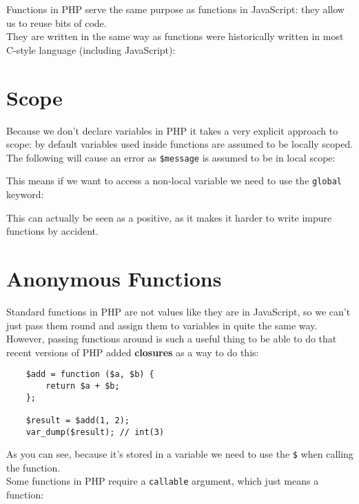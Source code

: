 Functions in PHP serve the same purpose as functions in JavaScript: they allow us to reuse bits of code.
\\

They are written in the same way as functions were historically written in most C-style language (including JavaScript):



\section{Scope}

Because we don't declare variables in PHP it takes a very explicit approach to scope: by default variables used inside functions are assumed to be locally scoped.
\\

The following will cause an error as \texttt{\$message} is assumed to be in local scope:


This means if we want to access a non-local variable we need to use the \texttt{global} keyword:


This can actually be seen as a positive, as it makes it harder to write impure functions by accident.


\section{Anonymous Functions}

Standard functions in PHP are not values like they are in JavaScript, so we can't just pass them round and assign them to variables in quite the same way. However, passing functions around is such a useful thing to be able to do that recent versions of PHP added \textbf{closures} as a way to do this:

\begin{verbatim}
    $add = function ($a, $b) {
        return $a + $b;
    };

    $result = $add(1, 2);
    var_dump($result); // int(3)
\end{verbatim}

As you can see, because it's stored in a variable we need to use the \texttt{\$} when calling the function.
\\

Some functions in PHP require a \texttt{callable} argument, which just means a function:

